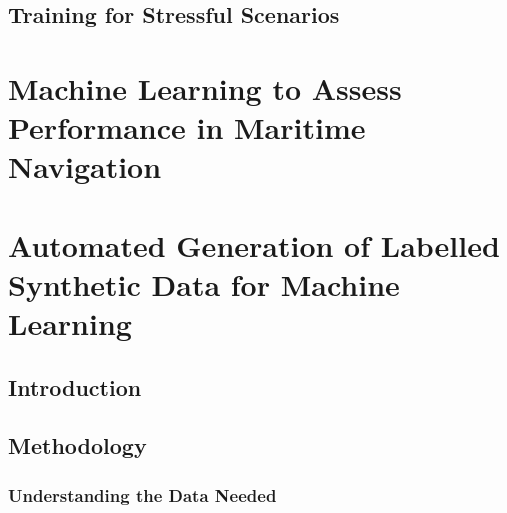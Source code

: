 \documentclass[12pt]{article}
\begin{document}
\subsection{Training for Stressful Scenarios}

\section{Machine Learning to Assess Performance in Maritime Navigation}



\section{Automated Generation of Labelled Synthetic Data for Machine Learning}

\subsection{Introduction}



\subsection{Methodology}

\subsubsection{Understanding the Data Needed}
\end{document}
